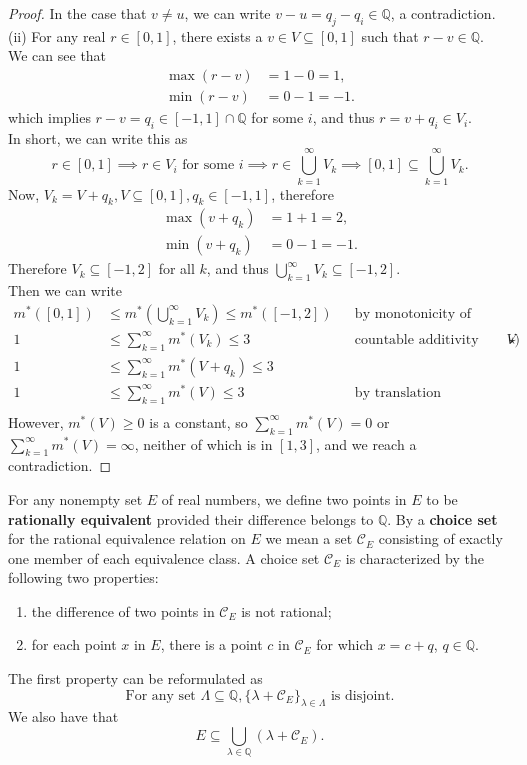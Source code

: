 \begin{flushleft}
\begin{proof}
		In the case that $v\neq u$, we can write $v-u=q_j-q_i\in\mathbb{Q}$, a contradiction.\\\medskip
		(ii) For any real $r\in[0,1]$, there exists a $v\in V\subseteq[0,1]$ such that $r-v\in\mathbb{Q}$.\\
		We can see that
		\begin{align*}
			\max(r-v)&=1-0=1,\\
			\min(r-v)&=0-1=-1.
		\end{align*}
		which implies $r-v=q_i\in[-1,1]\cap\mathbb{Q}$ for some $i$, and thus $r=v+q_i\in V_i$.\\
		In short, we can write this as
		\[
			r\in[0,1]\implies r\in V_i\text{ for some }i\implies r\in\bigcup_{k=1}^\infty V_k\implies[0,1]\subseteq\bigcup_{k=1}^\infty V_k. 
		\]
		Now, $V_k=V+q_k,V\subseteq[0,1],q_k\in[-1,1]$, therefore
		\begin{align*}
			\max(v+q_k)&=1+1=2,\\
			\min(v+q_k)&=0-1=-1.
		\end{align*}
		Therefore $V_k\subseteq[-1,2]$ for all $k$, and thus $\bigcup_{k=1}^\infty V_k\subseteq[-1,2]$.\\\medskip
		Then we can write
		\begin{align*}
			m^*([0,1])&\le m^*(\bigcup_{k=1}^\infty V_k) \le m^*([-1,2])&&\text{by monotonicity of outer measure}\\
			1&\le\sum_{k=1}^\infty m^*(V_k)\le 3&&\text{countable additivity (measurability of $V$) }\star\\
			1&\le\sum_{k=1}^\infty m^*(V+q_k)\le 3\\
			1&\le\sum_{k=1}^\infty m^*(V)\le 3&&\text{by translation invariance of outer measure}\\
		\end{align*}
		However, $m^*(V)\ge0$ is a constant, so $\sum_{k=1}^\infty m^*(V)=0$ or $\sum_{k=1}^\infty m^*(V)=\infty$, neither of which is in $[1,3]$, and we reach a contradiction.
	\end{proof}
	For any nonempty set $E$ of real numbers, we define two points in $E$ to be \textbf{rationally equivalent} provided their difference belongs to $\mathbb{Q}$. By a \textbf{choice set} for the rational equivalence relation on $E$ we mean a set $\mathcal{C}_E$ consisting of exactly one member of each equivalence class.
	A choice set $\mathcal{C}_E$ is characterized by the following two properties:
	\begin{enumerate}
		\item the difference of two points in $\mathcal{C}_E$ is not rational;
		\item for each point $x$ in $E$, there is a point $c$ in $\mathcal{C}_E$ for which $x=c+q$, $q\in\mathbb{Q}$.
	\end{enumerate}
	The first property can be reformulated as
	\[
		\text{For any set }\Lambda\subseteq\mathbb{Q},\{\lambda+\mathcal{C}_E\}_{\lambda\in\Lambda}\text{ is disjoint}.
	\]
	We also have that 
	\[
		E\subseteq\bigcup_{\lambda\in\mathbb{Q}}(\lambda+\mathcal{C}_E).
	\]
\end{flushleft}
